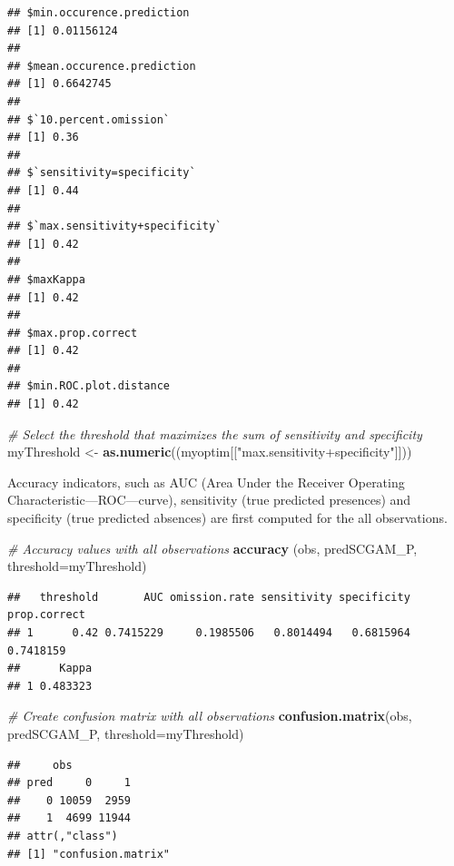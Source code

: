 \documentclass[
]{book}
\newenvironment{Shaded}{\begin{snugshade}}{\end{snugshade}}
\newcommand{\AttributeTok}[1]{\textcolor[rgb]{0.13,0.29,0.53}{#1}}
\newcommand{\CommentTok}[1]{\textcolor[rgb]{0.56,0.35,0.01}{\textit{#1}}}
\newcommand{\FunctionTok}[1]{\textcolor[rgb]{0.13,0.29,0.53}{\textbf{#1}}}
\newcommand{\NormalTok}[1]{#1}
\newcommand{\OtherTok}[1]{\textcolor[rgb]{0.56,0.35,0.01}{#1}}
\newcommand{\StringTok}[1]{\textcolor[rgb]{0.31,0.60,0.02}{#1}}
\begin{document}
\begin{verbatim}
## $min.occurence.prediction
## [1] 0.01156124
## 
## $mean.occurence.prediction
## [1] 0.6642745
## 
## $`10.percent.omission`
## [1] 0.36
## 
## $`sensitivity=specificity`
## [1] 0.44
## 
## $`max.sensitivity+specificity`
## [1] 0.42
## 
## $maxKappa
## [1] 0.42
## 
## $max.prop.correct
## [1] 0.42
## 
## $min.ROC.plot.distance
## [1] 0.42
\end{verbatim}

\begin{Shaded}
\begin{Highlighting}[]
\CommentTok{\# Select the threshold that maximizes the sum of sensitivity and specificity }
\NormalTok{myThreshold }\OtherTok{\textless{}{-}} \FunctionTok{as.numeric}\NormalTok{((myoptim[[}\StringTok{"max.sensitivity+specificity"}\NormalTok{]]))}
\end{Highlighting}
\end{Shaded}

Accuracy indicators, such as AUC (Area Under the Receiver Operating Characteristic---ROC---curve), sensitivity (true predicted presences) and specificity (true predicted absences) are first computed for the all observations.

\begin{Shaded}
\begin{Highlighting}[]
\CommentTok{\# Accuracy values with all observations}
\FunctionTok{accuracy}\NormalTok{ (obs, predSCGAM\_P, }\AttributeTok{threshold=}\NormalTok{myThreshold)}
\end{Highlighting}
\end{Shaded}

\begin{verbatim}
##   threshold       AUC omission.rate sensitivity specificity prop.correct
## 1      0.42 0.7415229     0.1985506   0.8014494   0.6815964    0.7418159
##      Kappa
## 1 0.483323
\end{verbatim}

\begin{Shaded}
\begin{Highlighting}[]
\CommentTok{\# Create confusion matrix with all observations}
\FunctionTok{confusion.matrix}\NormalTok{(obs, predSCGAM\_P, }\AttributeTok{threshold=}\NormalTok{myThreshold)}
\end{Highlighting}
\end{Shaded}

\begin{verbatim}
##     obs
## pred     0     1
##    0 10059  2959
##    1  4699 11944
## attr(,"class")
## [1] "confusion.matrix"
\end{verbatim}
\end{document}
